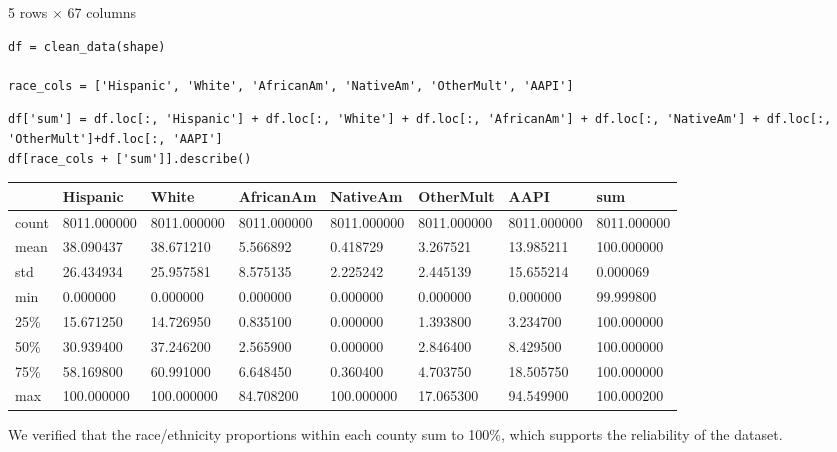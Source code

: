 \documentclass{article}
\begin{document}
\bigskip

5 rows $\times$ 67 columns

\begin{verbatim}
df = clean_data(shape)

race_cols = ['Hispanic', 'White', 'AfricanAm', 'NativeAm', 'OtherMult', 'AAPI']
\end{verbatim}

\begin{verbatim}
df['sum'] = df.loc[:, 'Hispanic'] + df.loc[:, 'White'] + df.loc[:, 'AfricanAm'] + df.loc[:, 'NativeAm'] + df.loc[:, 'OtherMult']+df.loc[:, 'AAPI']
df[race_cols + ['sum']].describe()
\end{verbatim}

\bigskip\noindent
\begin{tabular}{p{}p{}p{}p{}p{}p{}p{}p{}}
\toprule
 & Hispanic & White & AfricanAm & NativeAm & OtherMult & AAPI & sum \\
\hline
count & 8011.000000 & 8011.000000 & 8011.000000 & 8011.000000 & 8011.000000 & 8011.000000 & 8011.000000 \\
\hline
mean & 38.090437 & 38.671210 & 5.566892 & 0.418729 & 3.267521 & 13.985211 & 100.000000 \\
\hline
std & 26.434934 & 25.957581 & 8.575135 & 2.225242 & 2.445139 & 15.655214 & 0.000069 \\
\hline
min & 0.000000 & 0.000000 & 0.000000 & 0.000000 & 0.000000 & 0.000000 & 99.999800 \\
\hline
25\% & 15.671250 & 14.726950 & 0.835100 & 0.000000 & 1.393800 & 3.234700 & 100.000000 \\
\hline
50\% & 30.939400 & 37.246200 & 2.565900 & 0.000000 & 2.846400 & 8.429500 & 100.000000 \\
\hline
75\% & 58.169800 & 60.991000 & 6.648450 & 0.360400 & 4.703750 & 18.505750 & 100.000000 \\
\hline
max & 100.000000 & 100.000000 & 84.708200 & 100.000000 & 17.065300 & 94.549900 & 100.000200 \\
\hline
\bottomrule
\end{tabular}

\bigskip

We verified that the race/ethnicity proportions within each county sum to 100\%, which supports the reliability of the dataset.
\end{document}
